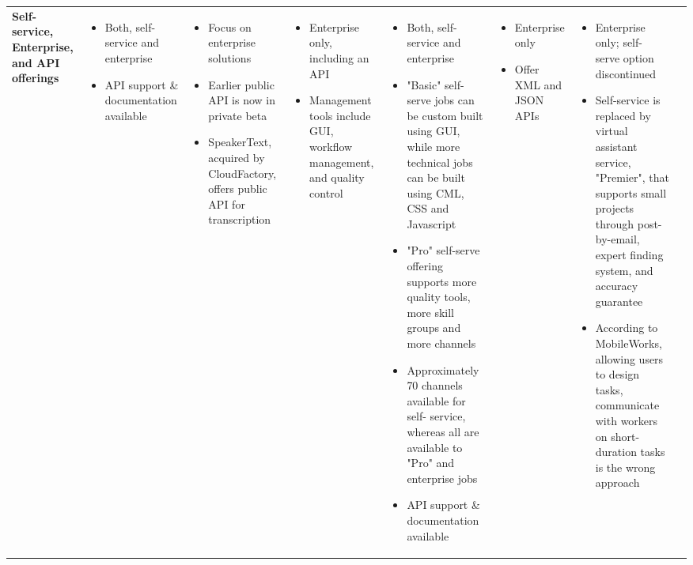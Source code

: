 \documentclass{sigchi}
\begin{document}
\begin{sidewaystable*}
\begin{tabular}[h]{| p{1.5cm}| p{2.7cm}| p{2.7cm}| p{2.7cm}| p{2.7cm}| p{2.7cm}| p{2.7cm}| p{2.7cm}|}
{\bf Self-service, Enterprise, and API offerings
} & 
{
\begin{itemize} [noitemsep,nolistsep]
\item  Both, self- service and enterprise
\item  API support \& documentation available
\end{itemize}
} &
{
\begin{itemize} [noitemsep,nolistsep]
\item  Focus on enterprise solutions
\item  Earlier public API is now in private beta
\item  SpeakerText, acquired by CloudFactory, offers public API for transcription
\end{itemize}
} &
{
\begin{itemize} [noitemsep,nolistsep]
\item  Enterprise only, including an API
\item  Management tools include GUI, workflow management, and quality control
\end{itemize}
} &
{
\begin{itemize} [noitemsep,nolistsep]
\item  Both, self- service and enterprise
\item  "Basic" self- serve jobs can be custom built using GUI, while more technical jobs can be built using CML, CSS and Javascript
\item  "Pro" self-serve offering supports more quality tools, more skill groups and more channels
\item  Approximately 70 channels available for self- service, whereas all are available to "Pro" and enterprise jobs
\item  API support \& documentation available
\end{itemize}
} &
{
\begin{itemize} [noitemsep,nolistsep]
\item  Enterprise only
\item  Offer XML and JSON APIs
\end{itemize}
} &
{
\begin{itemize} [noitemsep,nolistsep]
\item  Enterprise only; self- serve option discontinued
\item  Self-service is replaced by virtual assistant service, "Premier", that supports small projects through post-by-email, expert finding system, and accuracy guarantee
\item  According to MobileWorks, allowing users to design tasks, communicate with workers on short-duration tasks is the wrong approach

\end{itemize}}
\end{tabular}
\end{sidewaystable*}
\end{document}
